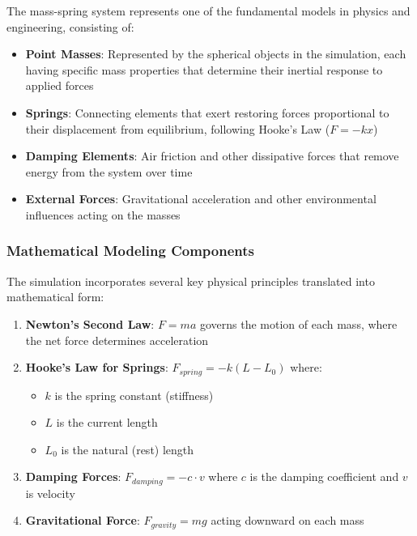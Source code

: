 The mass-spring system represents one of the fundamental models in physics and engineering, consisting of:

\begin{itemize}
  \item \textbf{Point Masses}: Represented by the spherical objects in the simulation, each having specific mass properties that determine their inertial response to applied forces
  \item \textbf{Springs}: Connecting elements that exert restoring forces proportional to their displacement from equilibrium, following Hooke's Law ($F = -kx$)
  \item \textbf{Damping Elements}: Air friction and other dissipative forces that remove energy from the system over time
  \item \textbf{External Forces}: Gravitational acceleration and other environmental influences acting on the masses
\end{itemize}

\subsubsection{Mathematical Modeling Components}

The simulation incorporates several key physical principles translated into mathematical form:

\begin{enumerate}
  \item \textbf{Newton's Second Law}: $F = ma$ governs the motion of each mass, where the net force determines acceleration
      
  \item \textbf{Hooke's Law for Springs}: $F_{spring} = -k(L - L_0)$ where:
  \begin{itemize}
    \item $k$ is the spring constant (stiffness)
    \item $L$ is the current length
    \item $L_0$ is the natural (rest) length
  \end{itemize}
      
  \item \textbf{Damping Forces}: $F_{damping} = -c \cdot v$ where $c$ is the damping coefficient and $v$ is velocity
      
  \item \textbf{Gravitational Force}: $F_{gravity} = mg$ acting downward on each mass
\end{enumerate}

